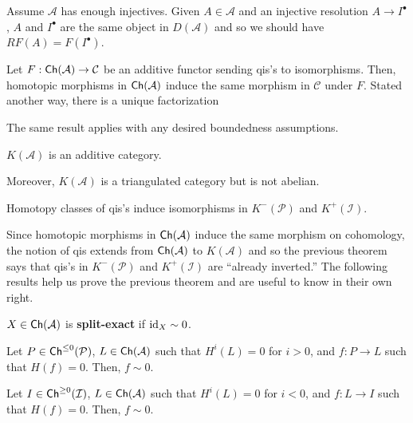 \documentclass[11pt]{article}
\renewcommand{\A}{\mathcal{A}}
\renewcommand{\C}{\mathcal{C}}
\newcommand{\I}{\mathcal{I}}
\renewcommand{\P}{\mathcal{P}}
\begin{document}
Assume $\A$ has enough injectives. Given $A\in\A$ and an injective resolution $A\to I^{\bullet}$, $A$ and $I^{\bullet}$ are the same object in $D(\A)$ and so we should have $RF(A)=F(I^{\bullet})$. 

\begin{lemma}[A, Lemma 5.1]
Let $F: \Ch(\A)\to\C$ be an additive functor sending qis's to isomorphisms. Then, homotopic morphisms in $\Ch(\A)$ induce the same morphism in $\C$ under $F$. Stated another way, there is a unique factorization
\begin{center}
\end{center}
\end{lemma}

The same result applies with any desired boundedness assumptions.

\begin{lemma}[A, Lemma 5.3]
$K(\A)$ is an additive category.
\end{lemma}

Moreover, $K(\A)$ is a triangulated category but is not abelian.

\begin{theorem}[A, Cor 5.10]
Homotopy classes of qis's induce isomorphisms in $K^-(\P)$ and $K^+(\I)$.
\end{theorem}

Since homotopic morphisms in $\Ch(\A)$ induce the same morphism on cohomology, the notion of qis extends from $\Ch(\A)$ to $K(\A)$ and so the previous theorem says that qis's in $K^-(\P)$ and $K^+(\I)$ are ``already inverted.'' The following results help us prove the previous theorem and are useful to know in their own right.

\begin{definition}
$X\in\Ch(\A)$ is \textbf{split-exact} if $\operatorname{id}_X\sim0$.
\end{definition}

\begin{lemma}[A, Lemma 5.11]
\hfill
\begin{enum}{\alph}
\item Let $P\in\Ch^{\leq0}(\P)$, $L\in\Ch(\A)$ such that $H^i(L)=0$ for $i>0$, and $f: P\to L$ such that $H(f)=0$. Then, $f\sim0$.

\item Let $I\in\Ch^{\geq0}(\I)$, $L\in\Ch(\A)$ such that $H^i(L)=0$ for $i<0$, and $f: L\to I$ such that $H(f)=0$. Then, $f\sim0$.
\end{enum}
\end{lemma}
\end{document}
